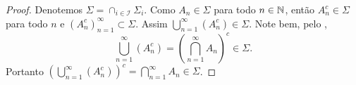 \begin{proof}
    Denotemos $\Sigma = \cap_{i\in\mathcal{I}}\Sigma_i$. Como $A_n\in \Sigma$ para todo $n\in \mathbb{N}$, então $A_n^{c}\in \Sigma$ para todo $n$ e $\left(A_n^{c}\right)_{n=1}^\infty \subset \Sigma$. Assim $\bigcup_{n=1}^\infty \left( A_n^{c} \right)\in \Sigma$. Note bem, pelo , 
    \begin{equation*}
        \bigcup_{n=1}^\infty \left( A_n^{c} \right) = \left( \bigcap_{n=1}^{\infty} A_n \right)^{c} \in \Sigma.
    \end{equation*}
    Portanto $\left(\bigcup_{n=1}^\infty \left( A_n^{c} \right)\right)^{c} = \bigcap_{n=1}^{\infty} A_n \in \Sigma$.
\end{proof}